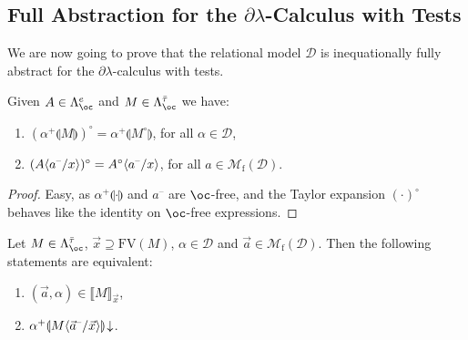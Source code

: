 \documentclass{LMCS}
\newcommand{\bool}{\mathbf{2}}
\newcommand{\dlam}{\ensuremath{\partial\lambda}}
\newcommand{\bang}{\oc}
\renewcommand{\hole}[1]{\llparenthesis #1\rrparenthesis}
\newcommand{\FV}{\mathrm{FV}}
\newcommand{\FSet}[1]{\Lambda^{#1}_{\bang}}
\newcommand{\TE}[1]{#1^{\circ}} \newcommand{\at}{\!::\!}
\newcommand{\Int}[1]{\llbracket #1\rrbracket} \newcommand{\trm}[1]{#1^{\textrm{--}}}
\newcommand{\cont}[2]{#1^{+}\hole{#2}}
\newcommand{\Mfin}[1]{\mathcal{M}_{\mathrm{f}}(#1)}
\newcommand{\seq}[1]{\vec{#1}}
\newcommand{\gto}{\ensuremath{\bar\tau}}
\newcommand{\cD}{\mathcal{D}}
\newcommand{\cOnv}[1]{#1\!\downarrow} \renewcommand{\div}[1]{#1\!\uparrow} \newcommand{\module}[1]{\bool\langle #1 \rangle}
\begin{document}
\subsection{Full Abstraction for the \dlam-Calculus with Tests}

We are now going to prove that the relational model $\cD$ is inequationally fully abstract for 
the \dlam-calculus with tests.
\begin{lem}\label{lem:aboutTE}
Given $A\in\FSet{e}$ and $M\in\FSet{\gto}$ we have:
\begin{enumerate}[\em(i)]
\item\label{lem:aboutTE1}
	$\TE{(\cont{\alpha}{M})} = \cont{\alpha}{\TE{M}}$, for all $\alpha\in\cD$,
\item\label{lem:aboutTE2}
	$\TE{(A\lsubst{x}{\trm{a}})} = \TE{A}\lsubst{x}{\trm{a}}$, for all $a\in\Mfin{\cD}$.
\end{enumerate}	
\end{lem}

\begin{proof} 
Easy, as $\cont{\alpha}{\cdot}$ and $\trm{a}$ are $\bang$-free,
and the Taylor expansion $\TE{(\cdot)}$ behaves like the identity on $\bang$-free expressions.
\end{proof}

\begin{prop}\label{prop:Fcontext}
Let $M \in \FSet{\gto}$, $\seq{x}\supseteq\FV(M)$, $\alpha\in \cD$ and $\seq a\in\Mfin{\cD}$. 
Then the following statements are equivalent:
\begin{enumerate}[\em(i)]
\item\label{prop:Fcontext1} 
	$(\seq{a},\alpha) \in \Int{M}_{\seq{x}}$,
\item\label{prop:Fcontext2} 
	$\cOnv{\cont{\alpha}{M\lsubst{\seq{x}}{\trm{\seq{a}}}}}$.
\end{enumerate}
\end{prop}
\end{document}
